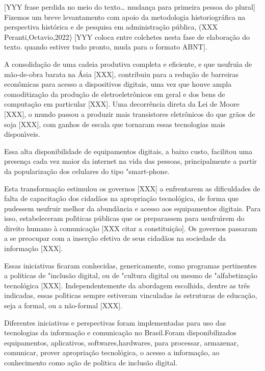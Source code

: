 \documentclass[
12pt,		%
openright,	%
twoside,  %
a4paper,			%
chapter=TITLE,		%
english,			%
french,				%
spanish,			%
brazil				%
]{USPSC-classe/USPSC}
\begin{document}
[YYY frase perdida no meio do texto… mudan\c{c}a para primeira pessoa do plural] Fizemos um breve levantamento com apoio da metodologia historiogr\'afica na  perspectiva hist\'orica e de pesquisa em administra\c{c}\~ao p\'ublica, (XXX Peranti,Octavio,2022) [YYY coloca entre colchetes nesta fase de elabora\c{c}\~ao do texto. quando estiver tudo pronto, muda para o formato ABNT].


A consolida\c{c}\~ao de uma cadeia produtiva completa e eficiente, e que usufru\'{\i}a de m\~ao-de-obra barata na \'Asia [XXX], contribuiu para a redu\c{c}\~ao de barreiras econ\^omicas para acesso a dispositivos digitais, uma vez que houve ampla comoditiza\c{c}\~ao da produ\c{c}\~ao de eletroeletr\^onicos em geral e dos bens de computa\c{c}\~ao em particular [XXX]. Uma decorr\^encia direta da Lei de Moore [XXX], o mundo passou a produzir mais transistores eletr\^onicos do que gr\~aos de soja [XXX], com ganhos de escala que tornaram essas tecnologias mais dispon\'{\i}veis.


Essa alta disponibilidade de equipamentos digitais, a baixo custo, facilitou uma presen\c{c}a cada vez maior da internet na vida das pessoas, principalmente a partir da populariza\c{c}\~ao dos celulares do tipo "smart-phone.


Esta transforma\c{c}\~ao estimulou os governos [XXX] a enfrentarem as dificuldades  de falta de  capacita\c{c}\~ao dos cidad\~aos na apropria\c{c}\~ao tecnol\'ogica, de forma que pudessem usufruir melhor da abund\^ancia e acesso aos equipamentos digitais. Para isso, estabeleceram pol\'{\i}ticas p\'ublicas que os preparassem para usufru\'{\i}rem do direito humano \`a comunica\c{c}\~ao [XXX citar a constitui\c{c}\~ao]. Os governos passaram a se preocupar com a inser\c{c}\~ao efetiva de seus cidad\~aos na sociedade da informa\c{c}\~ao [XXX].


Essas iniciativas ficaram conhecidas, genericamente, como programas pertinentes a politicas de "inclus\~ao digital, ou  de "cultura digital ou mesmo de "alfabetiza\c{c}\~ao tecnol\'ogica [XXX]. Independentemente da abordagem escolhida, dentre as tr\^es indicadas, essas pol\'{\i}ticas sempre estiveram vinculadas \`as estruturas de educa\c{c}\~ao, seja a formal, ou a n\~ao-formal [XXX].


Diferentes iniciativas e perspectivas foram implementadas para uso das tecnologias da informa\c{c}\~ao e comunica\c{c}\~ao no Brasil.Foram disponibilizados equipamentos, aplicativos, softwares,hardwares, para processar, armazenar, comunicar, prover apropria\c{c}\~ao tecnol\'ogica, o acesso a  informa\c{c}\~ao, ao conhecimento como a\c{c}\~ao de politica de inclus\~ao digital.
\end{document}
